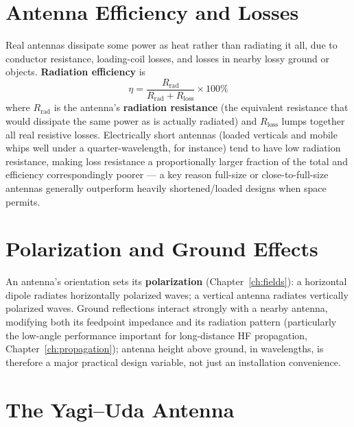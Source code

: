 \section{Antenna Efficiency and Losses}


Real antennas dissipate some power as heat rather than radiating it all,
due to conductor resistance, loading-coil losses, and losses in nearby
lossy ground or objects. \textbf{Radiation efficiency} is
\[
\eta = \frac{R_{\text{rad}}}{R_{\text{rad}}+R_{\text{loss}}} \times 100\%
\]
where $R_{\text{rad}}$ is the antenna's \textbf{radiation resistance}
(the equivalent resistance that would dissipate the same power as is
actually radiated) and $R_{\text{loss}}$ lumps together all real
resistive losses. Electrically short antennas (loaded verticals and
mobile whips well under a quarter-wavelength, for instance) tend to have
low radiation resistance, making loss resistance a proportionally larger
fraction of the total and efficiency correspondingly poorer --- a key
reason full-size or close-to-full-size antennas generally outperform
heavily shortened/loaded designs when space permits.

\section{Polarization and Ground Effects}

An antenna's orientation sets its \textbf{polarization}
(Chapter~\ref{ch:fields}): a horizontal dipole radiates
horizontally polarized waves; a vertical antenna radiates vertically
polarized waves. Ground reflections interact strongly with a nearby
antenna, modifying both its feedpoint impedance and its radiation
pattern (particularly the low-angle performance important for
long-distance HF propagation, Chapter~\ref{ch:propagation}); antenna
height above ground, in wavelengths, is therefore a major practical
design variable, not just an installation convenience.

\section{The Yagi--Uda Antenna}


